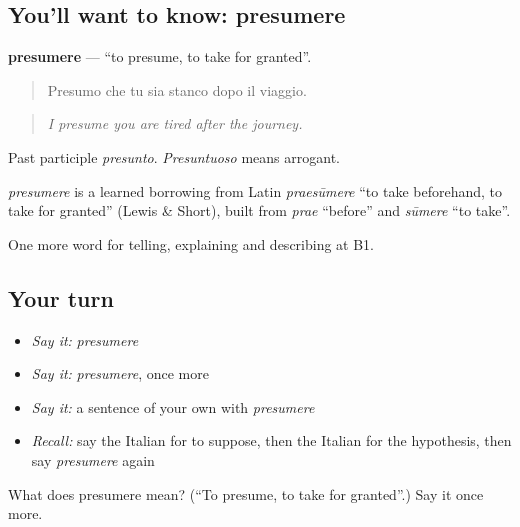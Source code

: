 \subsection*{You'll want to know: presumere}
\textbf{presumere} — \textquotedblleft{}to presume, to take for granted\textquotedblright{}.

\begin{quote}
Presumo che tu sia stanco dopo il viaggio.
\end{quote}

\begin{quote}
\emph{I presume you are tired after the journey.}
\end{quote}

Past participle \emph{presunto}. \emph{Presuntuoso} means arrogant.

\begin{cousinweb}
\emph{presumere} is a learned borrowing from Latin \emph{praesūmere} \textquotedblleft{}to take beforehand, to take for granted\textquotedblright{} (Lewis \& Short), built from \emph{prae} \textquotedblleft{}before\textquotedblright{} and \emph{sūmere} \textquotedblleft{}to take\textquotedblright{}.
\end{cousinweb}

\begin{grammarlens}[title={What you've built}]
One more word for telling, explaining and describing at B1.
\end{grammarlens}

\subsection*{Your turn}
\begin{itemize}
\raggedright
  \item \emph{Say it:} \emph{presumere}
  \item \emph{Say it:} \emph{presumere}, once more
  \item \emph{Say it:} a sentence of your own with \emph{presumere}
  \item \emph{Recall:} say the Italian for to suppose, then the Italian for the hypothesis, then say \emph{presumere} again
\end{itemize}

\begin{tcolorbox}[breakable,colback=teal!4,colframe=teal!35!black,title={Before you move on}]
What does presumere mean? (\textquotedblleft{}To presume, to take for granted\textquotedblright{}.) Say it once more.
\end{tcolorbox}
